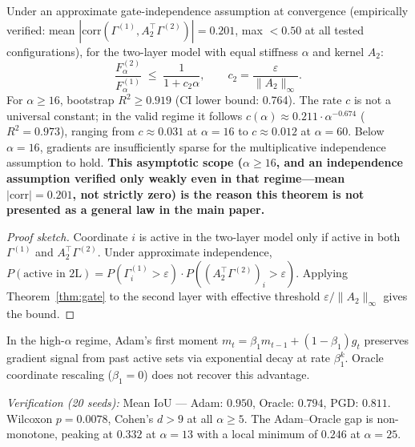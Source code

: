 \begin{theorem}
\label{thm:compound}
Under an approximate gate-independence assumption at convergence
(empirically verified: mean $|\mathrm{corr}(\Gamma^{(1)},A_2^\top\Gamma^{(2)})|=0.201$,
max $<0.50$ at all tested configurations), for the two-layer model with equal
stiffness $\alpha$ and kernel $A_2$:
\begin{equation}
  \frac{F^{(2)}_\alpha}{F^{(1)}_\alpha}
  \;\leq\;\frac{1}{1+c_2\alpha},\qquad
  c_2=\frac{\varepsilon}{\|A_2\|_\infty}.
\end{equation}
For $\alpha\geq16$, bootstrap $R^2\geq0.919$ (CI lower bound: 0.764). The
rate $c$ is not a universal constant; in the valid regime it follows
$c(\alpha)\approx0.211\cdot\alpha^{-0.674}$ ($R^2=0.973$), ranging from
$c\approx0.031$ at $\alpha=16$ to $c\approx0.012$ at $\alpha=60$. Below
$\alpha=16$, gradients are insufficiently sparse for the multiplicative
independence assumption to hold. \textbf{This asymptotic scope
($\alpha\geq16$, and an independence assumption verified only weakly even
in that regime---mean $|\mathrm{corr}|=0.201$, not strictly zero) is the
reason this theorem is not presented as a general law in the main paper.}
\end{theorem}
\begin{proof}[Proof sketch]
Coordinate $i$ is active in the two-layer model only if active in both
$\Gamma^{(1)}$ and $A_2^\top\Gamma^{(2)}$. Under approximate independence,
$P(\text{active in 2L})=P(\Gamma^{(1)}_i>\varepsilon)\cdot
P((A_2^\top\Gamma^{(2)})_i>\varepsilon)$. Applying Theorem~\ref{thm:gate}
to the second layer with effective threshold $\varepsilon/\|A_2\|_\infty$
gives the bound.
\end{proof}

\begin{lemma}
\label{lem:adam}
In the high-$\alpha$ regime, Adam's first moment
$m_t=\beta_1 m_{t-1}+(1-\beta_1)g_t$ preserves gradient signal from past
active sets via exponential decay at rate $\beta_1^k$. Oracle coordinate
rescaling ($\beta_1=0$) does not recover this advantage.

\noindent\emph{Verification (20 seeds):} Mean IoU --- Adam: $0.950$,
Oracle: $0.794$, PGD: $0.811$. Wilcoxon $p=0.0078$, Cohen's $d>9$ at all
$\alpha\geq5$. The Adam--Oracle gap is non-monotone, peaking at $0.332$ at
$\alpha=13$ with a local minimum of $0.246$ at $\alpha=25$.
\end{lemma}

